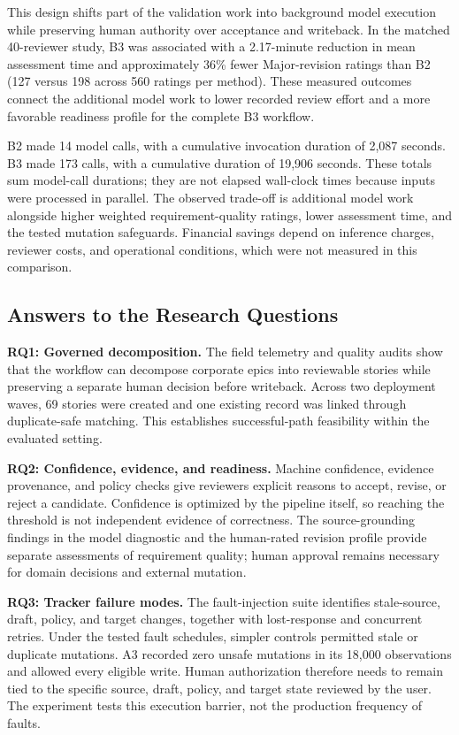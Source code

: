 \documentclass[manuscript,review]{acmart}
\begin{document}
This design shifts part of the validation work into background model execution while preserving human authority over acceptance and writeback. In the matched 40-reviewer study, B3 was associated with a 2.17-minute reduction in mean assessment time and approximately 36\% fewer Major-revision ratings than B2 (127 versus 198 across 560 ratings per method). These measured outcomes connect the additional model work to lower recorded review effort and a more favorable readiness profile for the complete B3 workflow.

B2 made 14 model calls, with a cumulative invocation duration of 2,087 seconds. B3 made 173 calls, with a cumulative duration of 19,906 seconds. These totals sum model-call durations; they are not elapsed wall-clock times because inputs were processed in parallel. The observed trade-off is additional model work alongside higher weighted requirement-quality ratings, lower assessment time, and the tested mutation safeguards. Financial savings depend on inference charges, reviewer costs, and operational conditions, which were not measured in this comparison.

\subsection{Answers to the Research Questions}
\textbf{RQ1: Governed decomposition.} The field telemetry and quality audits show that the workflow can decompose corporate epics into reviewable stories while preserving a separate human decision before writeback. Across two deployment waves, 69 stories were created and one existing record was linked through duplicate-safe matching. This establishes successful-path feasibility within the evaluated setting.

\textbf{RQ2: Confidence, evidence, and readiness.} Machine confidence, evidence provenance, and policy checks give reviewers explicit reasons to accept, revise, or reject a candidate. Confidence is optimized by the pipeline itself, so reaching the threshold is not independent evidence of correctness. The source-grounding findings in the model diagnostic and the human-rated revision profile provide separate assessments of requirement quality; human approval remains necessary for domain decisions and external mutation.

\textbf{RQ3: Tracker failure modes.} The fault-injection suite identifies stale-source, draft, policy, and target changes, together with lost-response and concurrent retries. Under the tested fault schedules, simpler controls permitted stale or duplicate mutations. A3 recorded zero unsafe mutations in its 18,000 observations and allowed every eligible write. Human authorization therefore needs to remain tied to the specific source, draft, policy, and target state reviewed by the user. The experiment tests this execution barrier, not the production frequency of faults.
\end{document}
